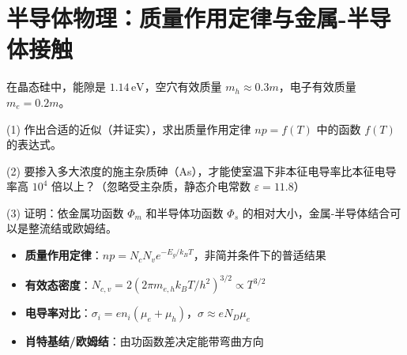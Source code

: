 \section{半导体物理：质量作用定律与金属-半导体接触}
\label{sec:mass-action-schottky}

\begin{modelbox}[题目：硅的质量作用定律与接触特性]
在晶态硅中，能隙是 $1.14\,\text{eV}$，空穴有效质量 $m_h\approx0.3m$，电子有效质量 $m_e=0.2m$。

(1) 作出合适的近似（并证实），求出质量作用定律 $np=f(T)$ 中的函数 $f(T)$ 的表达式。

(2) 要掺入多大浓度的施主杂质砷（As），才能使室温下非本征电导率比本征电导率高 $10^4$ 倍以上？（忽略受主杂质，静态介电常数 $\varepsilon=11.8$）

(3) 证明：依金属功函数 $\Phi_m$ 和半导体功函数 $\Phi_s$ 的相对大小，金属-半导体结合可以是整流结或欧姆结。
\end{modelbox}

\begin{tipbox}[考点快速分析]
\begin{itemize}
    \item \textbf{质量作用定律}：$np=N_cN_ve^{-E_g/k_BT}$，非简并条件下的普适结果
    \item \textbf{有效态密度}：$N_{c,v}=2(2\pi m_{e,h}k_BT/h^2)^{3/2}\propto T^{3/2}$
    \item \textbf{电导率对比}：$\sigma_i=en_i(\mu_e+\mu_h)$，$\sigma\approx eN_D\mu_e$
    \item \textbf{肖特基结/欧姆结}：由功函数差决定能带弯曲方向
\end{itemize}
\end{tipbox}

